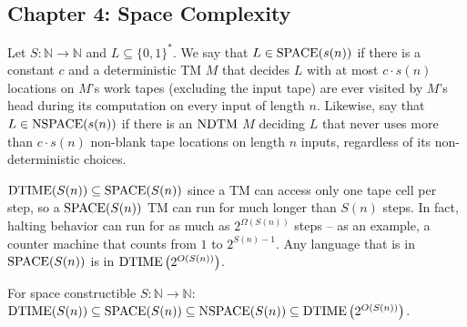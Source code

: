 \subsection*{Chapter 4: Space Complexity}
\begin{note}
  Let $S : \mathbb{N} \to \mathbb{N}$ and $L \subseteq \{0, 1\}^\ast$.
  We say that $L \in \mathrm{SPACE}(s(n))$ if there is a constant $c$ and
  a deterministic TM $M$ that
  decides $L$ with at most $c \cdot s(n)$ locations on
  $M$'s work tapes (excluding the input tape) are ever visited by $M$'s head
  during its computation on every input of length $n$.
  Likewise, say that $L \in \mathrm{NSPACE}(s(n))$ if there is an $\mathrm{NDTM}$ $M$ deciding
  $L$ that never uses more than $c \cdot s(n)$ non-blank tape locations on
  length $n$ inputs, regardless of its non-deterministic choices.
\end{note}

\begin{note}
  $\mathrm{DTIME}(S(n)) \subseteq \mathrm{SPACE}(S(n))$ since a TM can access only one
  tape cell per step, so a $\mathrm{SPACE}(S(n))$ TM can run for much longer than
  $S(n)$ steps.
  In fact, halting behavior can run for as much as $2^{\Omega (S(n))}$ steps
  -- as an example, a counter machine that counts from $1$ to
  $2^{S(n) - 1}$.
  Any language that is in $\mathrm{SPACE}(S(n))$ is
  in $\mathrm{DTIME}\left(2^{O(S(n))}\right)$.
\end{note}

\begin{note}
  For space constructible $S: \mathbb{N} \to \mathbb{N}$:
  $\mathrm{DTIME}(S(n)) \subseteq \mathrm{SPACE}(S(n)) \subseteq \mathrm{NSPACE}(S(n))
  \subseteq \mathrm{DTIME}\left(2^{O(S(n))}\right)$.
\end{note}

